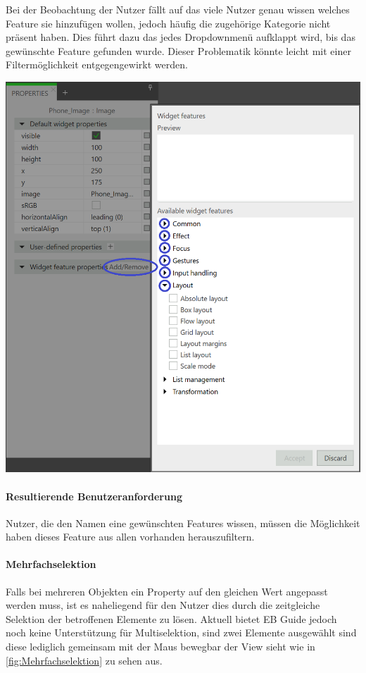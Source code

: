 Bei der Beobachtung der Nutzer fällt auf das viele Nutzer genau wissen welches Feature sie hinzufügen wollen, jedoch häufig die zugehörige Kategorie nicht präsent haben.
Dies führt dazu das jedes Dropdownmenü aufklappt wird, bis das gewünschte Feature gefunden wurde.
Dieser Problematik könnte leicht mit einer Filtermöglichkeit entgegengewirkt werden.

\begin{center}
  \includegraphics[scale=0.5]{figures/WidgetFeatureProperty.png}
  \label{fig:WidgetFeatureProperty}
\end{center}

\paragraph{Resultierende Benutzeranforderung}
Nutzer, die den Namen eine gewünschten Features wissen, müssen die Möglichkeit haben dieses Feature aus allen vorhanden herauszufiltern.

\paragraph{Mehrfachselektion}
Falls bei mehreren Objekten ein Property auf den gleichen Wert angepasst werden muss, ist es naheliegend für den Nutzer dies durch die zeitgleiche Selektion der betroffenen Elemente zu lösen.
Aktuell bietet EB Guide jedoch noch keine Unterstützung für Multiselektion, sind zwei Elemente ausgewählt sind diese lediglich gemeinsam mit der Maus bewegbar der View sieht wie in \cref{fig:Mehrfachselektion} zu sehen aus.

